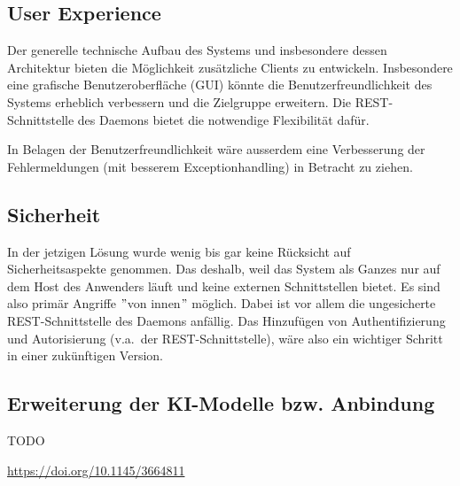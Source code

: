 \documentclass[a4paper,12pt]{report}
\begin{document}

    \subsection{User Experience}\label{subsec:user-experience}
    Der generelle technische Aufbau des Systems und insbesondere dessen Architektur bieten die Möglichkeit zusätzliche Clients zu entwickeln.
    Insbesondere eine grafische Benutzeroberfläche (GUI) könnte die Benutzerfreundlichkeit des Systems erheblich verbessern und die Zielgruppe erweitern.
    Die REST-Schnittstelle des Daemons bietet die notwendige Flexibilität dafür.

    In Belagen der Benutzerfreundlichkeit wäre ausserdem eine Verbesserung der Fehlermeldungen (mit besserem Exceptionhandling) in Betracht zu ziehen.

    \clearpage

    \subsection{Sicherheit}\label{subsec:sicherheit}
    In der jetzigen Lösung wurde wenig bis gar keine Rücksicht auf Sicherheitsaspekte genommen.
    Das deshalb, weil das System als Ganzes nur auf dem Host des Anwenders läuft und keine externen Schnittstellen bietet.
    Es sind also primär Angriffe \("\)von innen\("\) möglich.
    Dabei ist vor allem die ungesicherte REST-Schnittstelle des Daemons anfällig.
    Das Hinzufügen von Authentifizierung und Autorisierung (v.a.\ der REST-Schnittstelle), wäre also ein wichtiger Schritt in einer zukünftigen Version.

    \subsection{Erweiterung der KI-Modelle bzw. Anbindung}\label{subsec:erweiterung-der-ki-modelle}
    TODO


    \url{https://doi.org/10.1145/3664811}

    \printglossary
\end{document}
